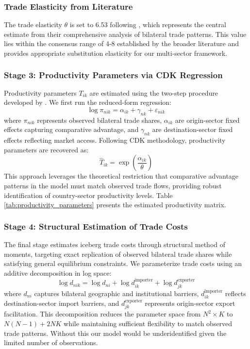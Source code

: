\subsubsection{Trade Elasticity from Literature}

The trade elasticity $\theta$ is set to 6.53 following \cite{costinot2012TheReviewofEconomicStudies}, which represents the central estimate from their comprehensive analysis of bilateral trade patterns. This value lies within the consensus range of 4-8 established by the broader literature \citep{eaton2002Econometrica} and provides appropriate substitution elasticity for our multi-sector framework.

\subsubsection{Stage 3: Productivity Parameters via CDK Regression}

Productivity parameters $T_{ik}$ are estimated using the two-step procedure developed by \cite{costinot2012TheReviewofEconomicStudies}. We first run the reduced-form regression:
\begin{equation}
\log \pi_{nik} = \alpha_{ik} + \gamma_{nk} + \varepsilon_{nik}
\end{equation}
where $\pi_{nik}$ represents observed bilateral trade shares, $\alpha_{ik}$ are origin-sector fixed effects capturing comparative advantage, and $\gamma_{nk}$ are destination-sector fixed effects reflecting market access. Following CDK methodology, productivity parameters are recovered as:
\begin{equation}\hat{T}_{ik} = \exp\left(\frac{\hat{\alpha}_{ik}}{\theta}\right)
\end{equation}
This approach leverages the theoretical restriction that comparative advantage patterns in the model must match observed trade flows, providing robust identification of country-sector productivity levels. Table \ref{tab:productivity_parameters} presents the estimated productivity matrix.

\subsubsection{Stage 4: Structural Estimation of Trade Costs}

The final stage estimates iceberg trade costs through structural method of moments, targeting exact replication of observed bilateral trade shares while satisfying general equilibrium constraints. We parameterize trade costs using an additive decomposition in log space:
\begin{equation}
\log d_{nik} = \log d_{ni} + \log d_{ik}^{\text{importer}} + \log d_{jk}^{\text{exporter}}
\end{equation}
where $d_{ni}$ captures bilateral geographic and institutional barriers, $d_{ik}^{\text{importer}}$ reflects destination-sector import barriers, and $d_{jk}^{\text{exporter}}$ represents origin-sector export facilitation. This decomposition reduces the parameter space from $N^2 \times K$ to $N(N-1) + 2NK$ while maintaining sufficient flexibility to match observed trade patterns. Without this our model would be underidentified given the limited number of observations.

